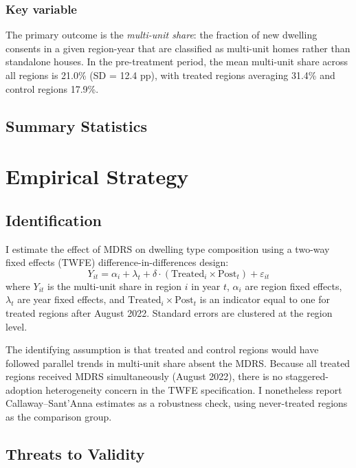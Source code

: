 \documentclass[12pt]{article}
\begin{document}
\subsubsection*{Key variable} The primary outcome is the \textit{multi-unit share}: the fraction of new dwelling consents in a given region-year that are classified as multi-unit homes rather than standalone houses. In the pre-treatment period, the mean multi-unit share across all regions is 21.0\% (SD = 12.4 pp), with treated regions averaging 31.4\% and control regions 17.9\%.

\subsection{Summary Statistics}




\section{Empirical Strategy}
\label{sec:strategy}

\subsection{Identification}

I estimate the effect of MDRS on dwelling type composition using a two-way fixed effects (TWFE) difference-in-differences design:
\begin{equation}
Y_{it} = \alpha_i + \lambda_t + \delta \cdot (\text{Treated}_i \times \text{Post}_t) + \varepsilon_{it}
\label{eq:twfe}
\end{equation}
where $Y_{it}$ is the multi-unit share in region $i$ in year $t$, $\alpha_i$ are region fixed effects, $\lambda_t$ are year fixed effects, and $\text{Treated}_i \times \text{Post}_t$ is an indicator equal to one for treated regions after August 2022. Standard errors are clustered at the region level.

The identifying assumption is that treated and control regions would have followed parallel trends in multi-unit share absent the MDRS. Because all treated regions received MDRS simultaneously (August 2022), there is no staggered-adoption heterogeneity concern in the TWFE specification. I nonetheless report Callaway--Sant'Anna \citeyearpar{callaway2021difference} estimates as a robustness check, using never-treated regions as the comparison group.

\subsection{Threats to Validity}
\end{document}
